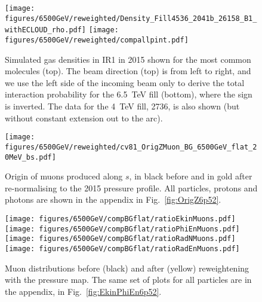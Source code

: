 \begin{figure}
\begin{center}
  \texttt{[image: figures/6500GeV/reweighted/Density\_Fill4536\_2041b\_26158\_B1\_withECLOUD\_rho.pdf]}
  \texttt{[image: figures/6500GeV/reweighted/compallpint.pdf]}
\end{center}
\vspace{-0.6cm}
 \caption{Simulated gas densities in IR1 in 2015 shown for the most common molecules (top). The beam direction (top) is from left to right, and we use the left side of the incoming beam only to derive the total interaction probability for the 6.5~TeV fill (bottom), where the sign is inverted. The data for the 4~TeV fill, 2736, is also shown (but without constant extension out to the arc).
  \label{pressure2015}}
\end{figure}

\begin{figure}
\begin{center}
  \texttt{[image: figures/6500GeV/reweighted/cv81\_OrigZMuon\_BG\_6500GeV\_flat\_20MeV\_bs.pdf]}
\end{center}
\vspace{-0.6cm}
 \caption{Origin of muons produced along $s$, in black before and in gold after re-normalising to the 2015 pressure profile. All particles, protons and photons are shown in the appendix in Fig.~\ref{fig:OrigZ6p52}. 
  \label{fig:OrigZ6p5}}
\end{figure}

\begin{figure}
\begin{center}

  \texttt{[image: figures/6500GeV/compBGflat/ratioEkinMuons.pdf]}
  \texttt{[image: figures/6500GeV/compBGflat/ratioPhiEnMuons.pdf]}
  \texttt{[image: figures/6500GeV/compBGflat/ratioRadNMuons.pdf]}
  \texttt{[image: figures/6500GeV/compBGflat/ratioRadEnMuons.pdf]}
\end{center}
\vspace{-0.6cm}
 \caption{Muon distributions before (black) and after (yellow) reweightening with the pressure map. The same set of plots for all particles are in the appendix, in Fig.~\ref{fig:EkinPhiEn6p52}.
  \label{fig:EkinPhiEn6p5}}
\end{figure}
